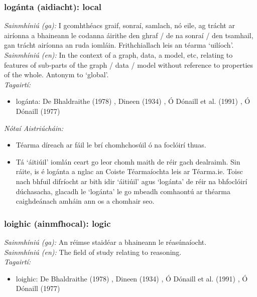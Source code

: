 \subsubsection*{logánta (aidiacht): local}
 \noindent \textit{Sainmhíniú (ga):} I gcomhthéacs graif, sonraí, samlach, nó eile, ag trácht ar airíonna a bhaineann le codanna áirithe den ghraf / de na sonraí / den tsamhail, gan trácht airíonna an ruda iomláin. Frithchiallach leis an téarma `uilíoch'.
\\
 \noindent \textit{Sainmhíniú (en):} In the context of a graph, data, a model, etc, relating to features of sub-parts of the graph / data / model without reference to properties of the whole. Antonym to `global'.
\\
 \noindent \textit{Tagairtí:}
\begin{itemize}
	\item logánta: De Bhaldraithe (1978) \cite{de-bhaldraithe}, Dineen (1934) \cite{dineen}, Ó Dónaill et al. (1991) \cite{focloir-beag}, Ó Dónaill (1977) \cite{odonaill}
\end{itemize}

 \noindent \textit{Nótaí Aistriúcháin:}
\begin{itemize}
	\item Téarma díreach ar fáil le brí chomhchosúil ó na foclóirí thuas.
	\item Tá `áitiúil' iomlán ceart go leor chomh maith de réir gach dealraimh. Sin ráite, is é logánta a nglac an Coiste Téarmaíochta leis ar Téarma.ie. Toisc nach bhfuil difríocht ar bith idir `áitiúil' agus `logánta' de réir na bhfoclóirí dúchasacha, glacadh le `logánta' le go mbeadh comhaontú ar théarma caighdeánach amháin ann os a chomhair seo.
\end{itemize}


\subsubsection*{loighic (ainmfhocal): logic}
 \noindent \textit{Sainmhíniú (ga):} An réimse staidéar a bhaineann le réasúnaíocht.
\\
 \noindent \textit{Sainmhíniú (en):} The field of study relating to reasoning.
\\
 \noindent \textit{Tagairtí:}
\begin{itemize}
	\item loighic: De Bhaldraithe (1978) \cite{de-bhaldraithe}, Dineen (1934) \cite{dineen}, Ó Dónaill et al. (1991) \cite{focloir-beag}, Ó Dónaill (1977) \cite{odonaill}
\end{itemize}

